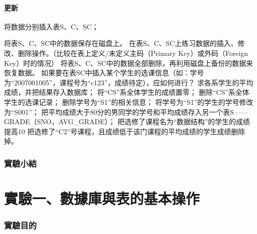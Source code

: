 \documentclass[12pt, a4paper]{report}
\begin{document}
\subsection{更新}

将数据分别插入表S、C、SC；



将表S、C、SC中的数据保存在磁盘上。
在表S、C、SC上练习数据的插入、修改、删除操作。（比较在表上定义/未定义主码（Primary Key）或外码（Foreign Key）时的情况）
将表S、C、SC中的数据全部删除，再利用磁盘上备份的数据来恢复数据。
如果要在表SC中插入某个学生的选课信息（如：学号为“2007001005”，课程号为“c123”，成绩待定），应如何进行？
求各系学生的平均成绩，并把结果存入数据库；
将“CS”系全体学生的成绩置零；
删除“CS”系全体学生的选课记录；
删除学号为“S1”的相关信息；
将学号为“S1”的学生的学号修改为“S001”；
把平均成绩大于80分的男同学的学号和平均成绩存入另一个表S——GRADE（SNO，AVG\_GRADE）；
把选修了课程名为“数据结构”的学生的成绩提高10%
把选修了“C2”号课程，且成绩低于该门课程的平均成绩的学生成绩删除掉。






\section{實驗小結}



\part{實驗一、數據庫與表的基本操作}

\section{實驗目的}
\end{document}
